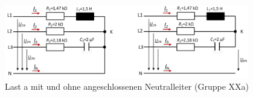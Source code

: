 \begin{enumerate}[label=\alph*)]
\pagebreak	
\ 
  \begin{figure}[h!]
    \begin{center}
      \includegraphics[width=0.95\textwidth]{img/img2.6.1.png}
    \end{center}
    \caption{Last a mit und ohne angeschlossenen Neutralleiter (Gruppe XXa)}\label{img2.6.1}
  \end{figure}
  
\end{enumerate}
